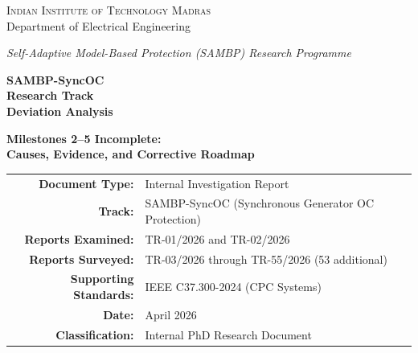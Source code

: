 \documentclass[12pt,a4paper]{article}
\begin{document}
\begin{titlepage}
\centering
\vspace*{1.5cm}


\vspace{0.8cm}
{\large\textsc{Indian Institute of Technology Madras}\\
Department of Electrical Engineering}

\vspace{0.4cm}
{\small\textit{Self-Adaptive Model-Based Protection (SAMBP) Research Programme}}

\vspace{1.5cm}

{\Huge\bfseries\color{iitBlue} SAMBP-SyncOC\\[0.3cm]
Research Track\\[0.3cm]
Deviation Analysis}

\vspace{0.6cm}
{\Large\color{missingRed}\bfseries Milestones 2--5 Incomplete:\\
Causes, Evidence, and Corrective Roadmap}

\vspace{1.0cm}


\vspace{0.8cm}
{\normalsize
\begin{tabular}{rl}
\textbf{Document Type:} & Internal Investigation Report \\[4pt]
\textbf{Track:}         & SAMBP-SyncOC (Synchronous Generator OC Protection) \\[4pt]
\textbf{Reports Examined:} & TR-01/2026 and TR-02/2026 \\[4pt]
\textbf{Reports Surveyed:} & TR-03/2026 through TR-55/2026 (53 additional) \\[4pt]
\textbf{Supporting Standards:} & IEEE C37.300-2024 (CPC Systems) \\[4pt]
\textbf{Date:}          & April 2026 \\[4pt]
\textbf{Classification:} & Internal PhD Research Document
\end{tabular}
}

\vfill


\end{titlepage}
\end{document}

